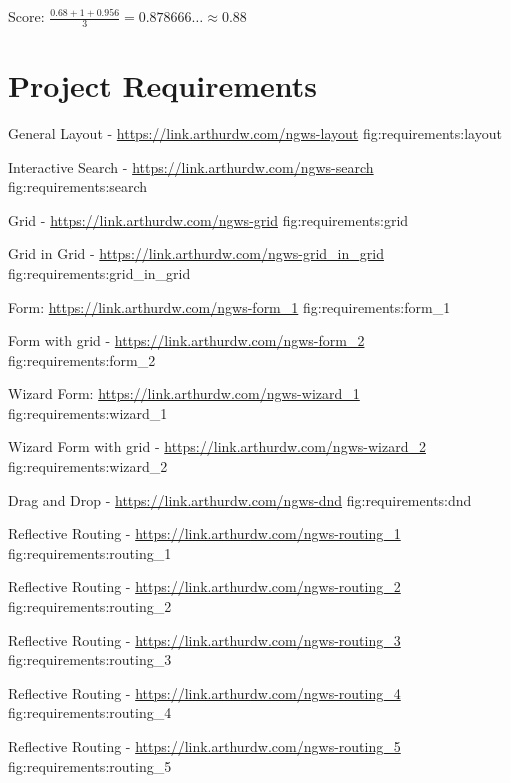 Score: $\frac{0.68 + 1 + 0.956}{3} = 0.878666\dots \approx 0.88$
\chapter{Project Requirements}

{General Layout - \url{https://link.arthurdw.com/ngws-layout}}
{fig:requirements:layout}

{Interactive Search - \url{https://link.arthurdw.com/ngws-search}}
{fig:requirements:search}

{Grid - \url{https://link.arthurdw.com/ngws-grid}}
{fig:requirements:grid}

{Grid in Grid - \url{https://link.arthurdw.com/ngws-grid_in_grid}}
{fig:requirements:grid_in_grid}

{Form: \url{https://link.arthurdw.com/ngws-form_1}}
{fig:requirements:form_1}

{Form with grid - \url{https://link.arthurdw.com/ngws-form_2}}
{fig:requirements:form_2}

{Wizard Form: \url{https://link.arthurdw.com/ngws-wizard_1}}
{fig:requirements:wizard_1}

{Wizard Form with grid - \url{https://link.arthurdw.com/ngws-wizard_2}}
{fig:requirements:wizard_2}

{Drag and Drop - \url{https://link.arthurdw.com/ngws-dnd}}
{fig:requirements:dnd}

{Reflective Routing - \url{https://link.arthurdw.com/ngws-routing_1}}
{fig:requirements:routing_1}

{Reflective Routing - \url{https://link.arthurdw.com/ngws-routing_2}}
{fig:requirements:routing_2}

{Reflective Routing - \url{https://link.arthurdw.com/ngws-routing_3}}
{fig:requirements:routing_3}

{Reflective Routing - \url{https://link.arthurdw.com/ngws-routing_4}}
{fig:requirements:routing_4}

{Reflective Routing - \url{https://link.arthurdw.com/ngws-routing_5}}
{fig:requirements:routing_5}

